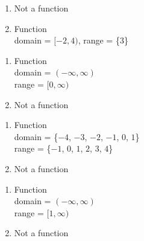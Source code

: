 \begin{multicols}{2}
\begin{enumerate}
\setcounter{enumi}{\value{HW}}

\item Not a function

\vfill

\columnbreak

\item Function \\ domain = $[-2, 4)$, range = \{$3$\}

\setcounter{HW}{\value{enumi}}
\end{enumerate}
\end{multicols}

\begin{multicols}{2}
\begin{enumerate}
\setcounter{enumi}{\value{HW}}


\item Function \\ domain = $(-\infty, \infty)$ \\  range = $[0,\infty)$

\vfill

\columnbreak

\item  Not a function

\setcounter{HW}{\value{enumi}}
\end{enumerate}
\end{multicols}

\begin{multicols}{2}
\begin{enumerate}
\setcounter{enumi}{\value{HW}}

\item Function \\ domain = \{$-4$, $-3$, $-2$, $-1$, $0$, $1$\} \\ range = \{$-1$, $0$, $1$, $2$, $3$, $4$\}

\vfill

\columnbreak

\item Not a function

\setcounter{HW}{\value{enumi}}
\end{enumerate}
\end{multicols}


\begin{multicols}{2}
\begin{enumerate}
\setcounter{enumi}{\value{HW}}

\item Function \\ domain = $(-\infty, \infty)$ \\ range = $[1, \infty)$

\vfill

\columnbreak

\item Not a function

\setcounter{HW}{\value{enumi}}
\end{enumerate}
\end{multicols}


